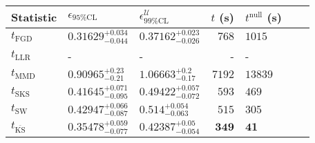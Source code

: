 \begin{tabular}{l|llr|llr}
	Statistic & $\epsilon_{95\%\mathrm{CL}}$ & $\epsilon^    {\mathcal{U}}_{99\%\mathrm{CL}}$ & $t$ (s) & $t^{\mathrm{null}}$ (s) \\
	\midrule
	$t_{\mathrm{FGD}}$ & ${\mathbf{0.31629_{-0.044}^{+0.034}}}$ & ${\mathbf{0.37162_{-0.026}^{+0.023}}}$ & $768$ & $1015$ \\
	$t_{\mathrm{LLR}}$ & - & - & - & - \\
	$t_{\mathrm{MMD}}$ & $0.90965_{-0.21}^{+0.23}$ & $1.06663_{-0.17}^{+0.2}$ & $7192$ & $13839$ \\
	$t_{\mathrm{SKS}}$ & $0.41645_{-0.095}^{+0.071}$ & $0.49422_{-0.072}^{+0.057}$ & $593$ & $469$ \\
	$t_{\mathrm{SW}}$ & $0.42947_{-0.087}^{+0.066}$ & $0.514_{-0.063}^{+0.054}$ & $515$ & $305$ \\
	$t_{\overline{\mathrm{KS}}}$ & $0.35478_{-0.077}^{+0.059}$ & $0.42387_{-0.054}^{+0.05}$ & ${\mathbf{349}}$ & ${\mathbf{41}}$ \\
	\bottomrule
\end{tabular}